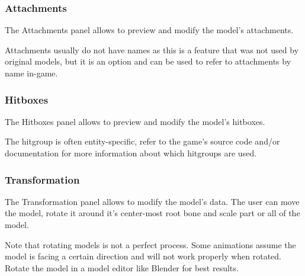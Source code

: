 \documentclass[10pt, a4paper, titlepage, oneside]{article}
\begin{document}
\subsubsection{Attachments}

The Attachments panel allows to preview and modify the model's attachments.

\vspace{\baselineskip}
Attachments usually do not have names as this is a feature that was not used by original models, but it is an option and can be used to refer to attachments by name in-game.

\subsubsection{Hitboxes}

The Hitboxes panel allows to preview and modify the model's hitboxes.

\vspace{\baselineskip}
The hitgroup is often entity-specific, refer to the game's source code and/or documentation for more information about which hitgroups are used.

\subsubsection{Transformation}

The Transformation panel allows to modify the model's data. The user can move the model, rotate it around it's center-most root bone and scale part or all of the model.

\vspace{\baselineskip}
Note that rotating models is not a perfect process. Some animations assume the model is facing a certain direction and will not work properly when rotated. Rotate the model in a model editor like Blender for best results.

\setlength{\parindent}{15pt}
\end{document}
